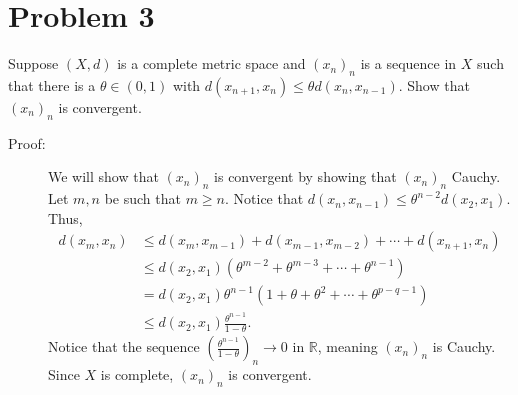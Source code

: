 \documentclass[8pt]{extarticle}
\newcommand{\R}{\mathbb{R}}
\begin{document}
  \section{Problem 3}%
  Suppose $(X,d)$ is a complete metric space and $(x_n)_n$ is a sequence in $X$ such that there is a $\theta \in (0,1)$ with $d(x_{n+1},x_n) \leq \theta d(x_n,x_{n-1})$. Show that $(x_n)_n$ is convergent.
  \begin{description}
    \item[Proof:] We will show that $(x_n)_n$ is convergent by showing that $(x_n)_n$ Cauchy. Let $m,n$ be such that $m\geq n$. Notice that $d(x_n,x_{n-1}) \leq \theta^{n-2}d(x_2,x_1)$. Thus,
      \begin{align*}
        d(x_m,x_n) &\leq d(x_m,x_{m-1}) + d(x_{m-1},x_{m-2}) + \cdots + d(x_{n+1},x_n)\\
                   &\leq d(x_2,x_1)\left(\theta^{m-2} + \theta^{m-3} + \cdots + \theta^{n-1}\right)\\
                   &= d(x_2,x_1) \theta^{n-1}\left(1 + \theta + \theta^2 + \cdots + \theta^{p-q-1}\right)\\
                   &\leq d(x_2,x_1)\frac{\theta^{n-1}}{1-\theta}.
      \end{align*}
      Notice that the sequence $\left(\frac{\theta^{n-1}}{1-\theta}\right)_{n}\rightarrow 0$ in $\R$, meaning $(x_n)_n$ is Cauchy. Since $X$ is complete, $(x_n)_n$ is convergent.
  \end{description}
\end{document}
